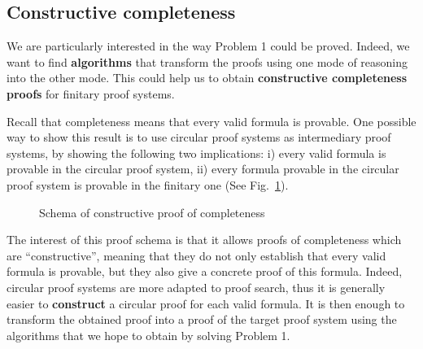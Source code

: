 \documentclass{article}
\begin{document}
\subsection{Constructive completeness}

We are particularly interested in the way Problem 1 could be proved. 
Indeed, we want to find \textbf{algorithms} that transform the proofs using one mode of reasoning into the other mode. This could help us to obtain \textbf{constructive completeness proofs} for finitary proof systems.


Recall that completeness means that every valid formula is provable. One possible way to show this result is to use circular proof systems as intermediary proof systems, by showing the following two implications:
i) every valid formula is provable in the circular proof system, ii) every formula provable in the circular proof system is provable in the finitary one (See Fig.~\ref{ConstructiveCompleteness}).   
 

\begin{figure}
  \begin{flushleft}
\end{flushleft}
\caption{Schema of constructive proof of completeness  \label{ConstructiveCompleteness}}
\end{figure}

The interest of this proof schema is that it allows proofs of completeness which are ``constructive'', meaning that they do not only establish that every valid formula is provable, but they also give a concrete proof of this formula. Indeed, circular proof systems are more adapted to proof search, thus it is generally easier to  \textbf{construct}
a circular proof for each valid formula. It is then enough to transform the obtained proof into a proof of the target proof system using the algorithms that we hope to obtain by solving Problem 1.
  
\end{document}
